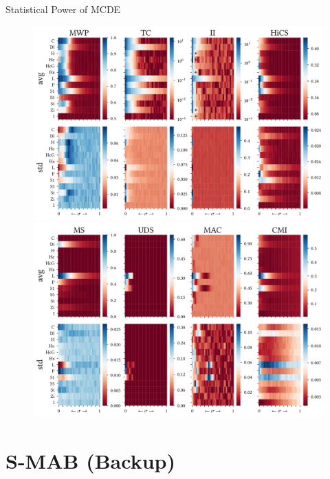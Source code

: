 \documentclass[16pt,usenames,dvipsnames, notheorems]{beamer}
\theoremstyle{definition}
\theoremstyle{example}
\theoremstyle{plain}
\begin{document}
\begin{frame}{Statistical Power of MCDE}

\begin{figure}
	\centering
	\begin{overprint}
		 \includegraphics[width=0.9\linewidth]{figures/Fig6_large_1-2_thesis-compressed.pdf}
		\onslide<2>  \includegraphics[width=0.9\linewidth]{figures/Fig6_large_2-2_thesis-compressed.pdf}
	\end{overprint}
\end{figure}

\end{frame}

\section{S-MAB (Backup)}
\end{document}

